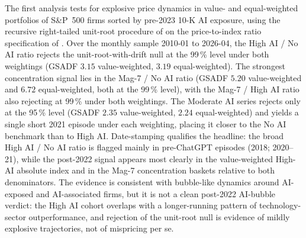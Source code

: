 The first analysis tests for explosive price dynamics in
value- and equal-weighted portfolios of S\&P~500 firms sorted
by pre-2023 10-K AI exposure, using the recursive right-tailed
unit-root procedure of \citet{phillipsShiYu2015a} on the
price-to-index ratio specification of \citet{baselePhillipsShi2025}.
Over the monthly sample 2010-01 to 2026-04, the High AI / No AI
ratio rejects the unit-root-with-drift null at the 99\,\% level
under both weightings (GSADF $3.15$ value-weighted, $3.19$
equal-weighted). The strongest concentration signal lies in the
Mag-7 / No AI ratio (GSADF $5.20$ value-weighted and $6.72$
equal-weighted, both at the 99\,\% level), with the
Mag-7 / High AI ratio also rejecting at 99\,\% under both
weightings. The Moderate AI series rejects only at the 95\,\%
level (GSADF $2.35$ value-weighted, $2.24$ equal-weighted) and
yields a single short 2021 episode under each weighting,
placing it closer to the No AI benchmark than to High AI.
Date-stamping qualifies the headline: the broad High AI / No AI
ratio is flagged mainly in pre-ChatGPT episodes (2018; 2020--21),
while the post-2022 signal appears most clearly in the
value-weighted High-AI absolute index and in the Mag-7
concentration baskets relative to both denominators. The
evidence is consistent with bubble-like dynamics around
AI-exposed and AI-associated firms, but it is not a clean
post-2022 AI-bubble verdict: the High AI cohort overlaps with
a longer-running pattern of technology-sector outperformance,
and rejection of the unit-root null is evidence of mildly
explosive trajectories, not of mispricing per se.

